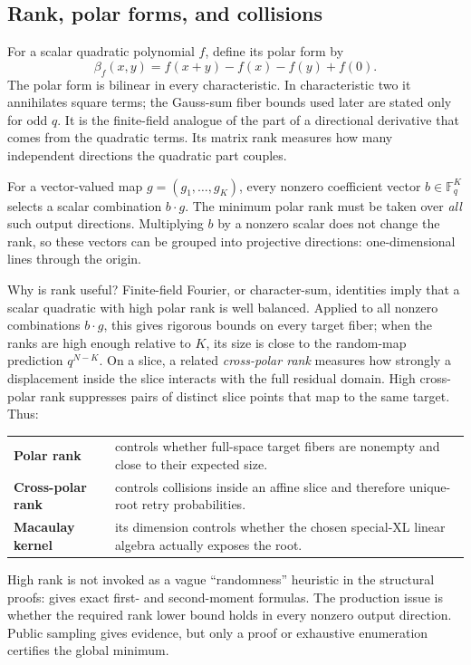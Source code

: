 \documentclass[11pt]{article}
\newcommand{\F}{\mathbb F}
\begin{document}
\subsection{Rank, polar forms, and collisions}\label{sec:rank-primer}

For a scalar quadratic polynomial $f$, define its polar form by
\[
  \beta_f(x,y)=f(x+y)-f(x)-f(y)+f(0).
\]
The polar form is bilinear in every characteristic.  In characteristic two it
annihilates square terms; the Gauss-sum fiber bounds used later are stated only
for odd $q$.  It is the finite-field analogue of the part of a directional
derivative that comes from the quadratic terms.  Its matrix rank measures how
many independent directions the quadratic part couples.

For a vector-valued map $g=(g_1,\ldots,g_K)$, every nonzero coefficient vector
$b\in\F_q^K$ selects a scalar combination $b\cdot g$.  The minimum polar rank
must be taken over \emph{all} such output directions.  Multiplying $b$ by a nonzero scalar does not change the rank, so these
vectors can be grouped into projective directions: one-dimensional lines
through the origin.

Why is rank useful?  Finite-field Fourier, or character-sum, identities imply
that a scalar quadratic with high polar rank is well balanced.  Applied to all nonzero combinations
$b\cdot g$, this gives rigorous bounds on every target fiber; when the ranks
are high enough relative to $K$, its size is close to the random-map prediction
$q^{N-K}$.  On a slice, a related
\emph{cross-polar rank} measures how strongly a displacement inside the slice
interacts with the full residual domain.  High cross-polar rank suppresses
pairs of distinct slice points that map to the same target.  Thus:
\begin{center}
\begin{tabularx}{0.91\textwidth}{@{}>{\bfseries}p{}X@{}}
Polar rank & controls whether full-space target fibers are nonempty and close
to their expected size.\\
Cross-polar rank & controls collisions inside an affine slice and therefore
unique-root retry probabilities.\\
Macaulay kernel & its dimension controls whether the chosen special-XL linear
algebra actually exposes the root.
\end{tabularx}
\end{center}
High rank is not invoked as a vague ``randomness'' heuristic in the structural
proofs:  gives exact first- and second-moment formulas.  The
production issue is whether the required rank lower bound holds in every
nonzero output direction.  Public sampling gives evidence, but only a proof or
exhaustive enumeration certifies the global minimum.
\end{document}
